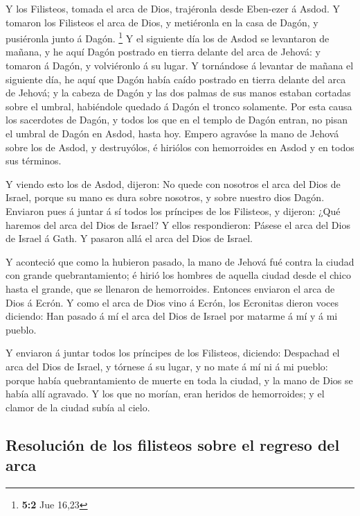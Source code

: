  Y los Filisteos, tomada el arca de Dios, trajéronla desde
Eben-ezer á Asdod.  Y tomaron los Filisteos el arca de Dios,
y metiéronla en la casa de Dagón, y pusiéronla junto á Dagón.
\footnote{\textbf{5:2} Jue 16,23}  Y el siguiente día los de
Asdod se levantaron de mañana, y he aquí Dagón postrado en tierra
delante del arca de Jehová: y tomaron á Dagón, y volviéronlo á su lugar.
 Y tornándose á levantar de mañana el siguiente día, he aquí
que Dagón había caído postrado en tierra delante del arca de Jehová; y
la cabeza de Dagón y las dos palmas de sus manos estaban cortadas sobre
el umbral, habiéndole quedado á Dagón el tronco solamente. 
Por esta causa los sacerdotes de Dagón, y todos los que en el templo de
Dagón entran, no pisan el umbral de Dagón en Asdod, hasta hoy.
 Empero agravóse la mano de Jehová sobre los de Asdod, y
destruyólos, é hiriólos con hemorroides en Asdod y en todos sus
términos.

 Y viendo esto los de Asdod, dijeron: No quede con nosotros
el arca del Dios de Israel, porque su mano es dura sobre nosotros, y
sobre nuestro dios Dagón.  Enviaron pues á juntar á sí todos
los príncipes de los Filisteos, y dijeron: ¿Qué haremos del arca del
Dios de Israel? Y ellos respondieron: Pásese el arca del Dios de Israel
á Gath. Y pasaron allá el arca del Dios de Israel.

 Y aconteció que como la hubieron pasado, la mano de Jehová
fué contra la ciudad con grande quebrantamiento; é hirió los hombres de
aquella ciudad desde el chico hasta el grande, que se llenaron de
hemorroides.  Entonces enviaron el arca de Dios á Ecrón. Y
como el arca de Dios vino á Ecrón, los Ecronitas dieron voces diciendo:
Han pasado á mí el arca del Dios de Israel por matarme á mí y á mi
pueblo.

 Y enviaron á juntar todos los príncipes de los Filisteos,
diciendo: Despachad el arca del Dios de Israel, y tórnese á su lugar, y
no mate á mí ni á mi pueblo: porque había quebrantamiento de muerte en
toda la ciudad, y la mano de Dios se había allí agravado. 
Y los que no morían, eran heridos de hemorroides; y el clamor de la
ciudad subía al cielo.

\hypertarget{resoluciuxf3n-de-los-filisteos-sobre-el-regreso-del-arca}{%
\subsection{Resolución de los filisteos sobre el regreso del
arca}\label{resoluciuxf3n-de-los-filisteos-sobre-el-regreso-del-arca}}

